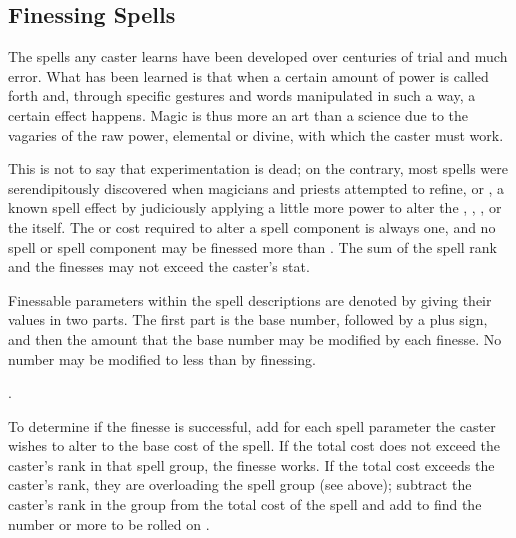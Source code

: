 \begin{multicols*}{2}
\subsection{Finessing Spells}
The spells any caster learns have been developed over centuries of trial and much error. What has been learned is that when a certain amount of power is called forth and, through specific gestures and words manipulated in such a way, a certain effect happens. Magic is thus more an art than a science due to the vagaries of the raw power, elemental or divine, with which the caster must work.

This is not to say that experimentation is dead; on the contrary, most spells were serendipitously discovered when magicians and priests attempted to refine, or , a known spell effect by judiciously applying a little more power to alter the , , , or the  itself. The \EU or \DU cost required to alter a spell component is always one, and no spell or spell component may be finessed more than . The sum of the spell rank and the finesses may not exceed the caster's \PWR stat.

Finessable parameters within the spell descriptions are denoted by giving their values in two parts. The first part is the base number, followed by a plus sign, and then the
amount that the base number may be modified by each finesse. No number may be modified to less than  by finessing.

. 

To determine if the finesse is successful, add  for each spell parameter the caster wishes to alter to the base cost of the spell. If the total cost does not exceed the caster's rank in that spell group, the finesse works. If the total cost exceeds the caster's rank, they are overloading the spell group (see above); subtract the caster's rank in the group from the total cost of the spell and add  to find the number or more to be rolled on .


\end{multicols*}

